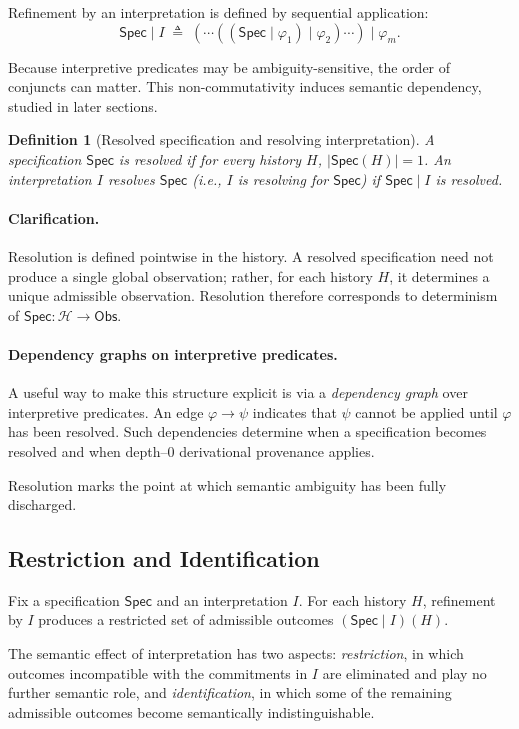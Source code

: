\documentclass[acmsmall,nonacm]{acmart}
\newtheorem{definition}{Definition}
\theoremstyle{remark}
\numberwithin{definition}{section}
\numberwithin{theorem}{section}
\numberwithin{lemma}{section}
\numberwithin{corollary}{section}
\numberwithin{remark}{section}
\numberwithin{example}{section}
\numberwithin{observation}{section}
\numberwithin{assumption}{section}
\newcommand{\Hist}{\mathcal{H}}
\newcommand{\Obs}{\mathsf{Obs}}
\newcommand{\Spec}{\mathsf{Spec}}
\begin{document}
Refinement by an interpretation is defined by sequential application:
\[
  \Spec \mid I
  \;\triangleq\;
  (\cdots((\Spec \mid \varphi_1)\mid \varphi_2)\cdots)\mid \varphi_m .
\]

Because interpretive predicates may be ambiguity-sensitive, the order of conjuncts
can matter.
This non-commutativity induces semantic dependency, studied in later sections.

\begin{definition}[Resolved specification and resolving interpretation]
A specification $\Spec$ is \emph{resolved} if for every history $H$, $|\Spec(H)| = 1$.
An interpretation $I$ \emph{resolves} $\Spec$ (i.e., $I$ is \emph{resolving for} $\Spec$) if $\Spec \mid I$ is resolved.
\end{definition}

\paragraph{Clarification.}
Resolution is defined pointwise in the history.
A resolved specification need not produce a single global observation; rather,
for each history $H$, it determines a unique admissible observation.
Resolution therefore corresponds to determinism of $\Spec : \Hist \to \Obs$.

\paragraph{Dependency graphs on interpretive predicates.}
A useful way to make this structure explicit is via a \emph{dependency graph}
over interpretive predicates.
An edge $\varphi \rightarrow \psi$ indicates that $\psi$ cannot be applied until
$\varphi$ has been resolved.
Such dependencies determine when a specification becomes resolved and when
depth--0 derivational provenance applies.

Resolution marks the point at which semantic ambiguity has been fully discharged.

\subsection{Restriction and Identification}

Fix a specification $\Spec$ and an interpretation $I$.
For each history $H$, refinement by $I$ produces a restricted set of admissible
outcomes $(\Spec \mid I)(H)$.

The semantic effect of interpretation has two aspects:
\emph{restriction}, in which outcomes incompatible with the commitments in $I$ are eliminated and play no further semantic role, and \emph{identification}, in which some of the remaining admissible outcomes become semantically indistinguishable.
\end{document}
